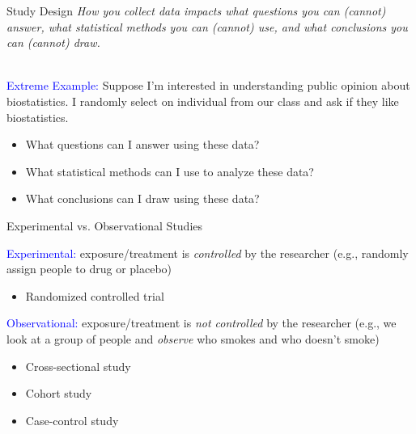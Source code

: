 \documentclass[10pt,t]{beamer}
\begin{document}
\begin{frame}{Study Design}
\textit{How you collect data impacts what questions you can (cannot) answer, what statistical methods you can (cannot) use, and what conclusions you can (cannot) draw.} \\~\

\textcolor{blue}{Extreme Example:} Suppose I'm interested in understanding public opinion about biostatistics. I randomly select on individual from our class and ask if they like biostatistics.

\begin{itemize}
	\item What questions can I answer using these data?
	\item What statistical methods can I use to analyze these data?
	\item What conclusions can I draw using these data?
\end{itemize}
\end{frame}

\begin{frame}{Experimental vs. Observational Studies}

\textcolor{blue}{Experimental:} exposure/treatment is \textit{controlled} by the researcher (e.g., randomly assign people to drug or placebo)
\begin{itemize}
	\item Randomized controlled trial 
\end{itemize}

\vspace{0.3cm}

\textcolor{blue}{Observational:} exposure/treatment is \textit{not controlled} by the researcher (e.g., we look at a group of people and \textit{observe} who smokes and who doesn't smoke)
\begin{itemize}
	\item Cross-sectional study
	\item Cohort study
	\item Case-control study
\end{itemize}
\end{frame}
	
\end{document}
